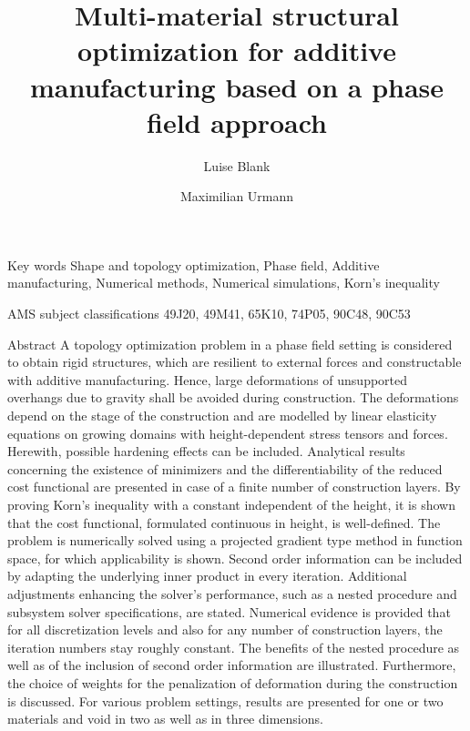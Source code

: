\documentclass[a4paper,11pt]{article}
\title{Multi-material structural optimization for additive manufacturing based on a phase field approach}
\author[1]{Luise Blank}
\author[1]{Maximilian Urmann}
\affil[1]{Fakultät für Mathematik, Universität Regensburg, 93040 Regensburg, Germany, email: \href{mailto:luise.blank@ur.de}{luise.blank@ur.de}, \href{mailto:maximilian.urmann@ur.de}{maximilian.urmann@ur.de}}
\date{}
\makeatletter
\newenvironment{@abs}[1]{%
  \vspace{4pt}%
  \parindent 15pt {\bfseries #1. }\ignorespaces
     }
     {\par\vspace{7pt}}
\renewenvironment{abstract}{\begin{@abs}{{Abstract}}}{\end{@abs}}
\newenvironment{keywords}{\begin{@abs}{Key words}}{\end{@abs}}
\newenvironment{AMS}{\begin{@abs}{AMS subject classifications}}{\end{@abs}}
\theoremstyle{remark}
\makeatother
\begin{document}
\maketitle

\begin{keywords}
  Shape and topology optimization,
  Phase field,
  Additive manufacturing,
  Numerical methods,
  Numerical simulations,
  Korn's inequality
\end{keywords}

\begin{AMS} 
  49J20, 
  49M41, 
  65K10, 
  74P05, 
  90C48, 
  90C53 
\end{AMS}

\begin{abstract}
A topology optimization problem in a phase field setting is considered to obtain rigid structures, which are resilient to external forces and constructable with additive manufacturing. 
Hence, large deformations of unsupported overhangs due to gravity shall be avoided during construction. 
The deformations depend on the stage of the construction and are modelled by linear elasticity equations on growing domains with height-dependent stress tensors and forces. 
Herewith, possible hardening effects can be included. 
Analytical results concerning the existence of minimizers and the differentiability of the reduced cost functional are presented in case of a finite number of construction layers. 
By proving Korn's inequality with a constant independent of the height, it is shown that the cost functional, formulated continuous in height, is well-defined. 
The problem is numerically solved using a projected gradient type method in function space, for which applicability is shown. 
Second order information can be included by adapting the underlying inner product in every iteration. Additional adjustments enhancing the solver's performance, such as a nested procedure and subsystem solver specifications, are stated. 
Numerical evidence is provided that for all discretization levels and also for any number of construction layers, the iteration numbers stay roughly constant. 
The benefits of the nested procedure as well as of the inclusion of second order information are illustrated. 
Furthermore, the choice of weights for the penalization of deformation during the construction is discussed. 
For various problem settings, results are presented for one or two materials and void in two as well as in three dimensions.
\end{abstract}

\end{document}
